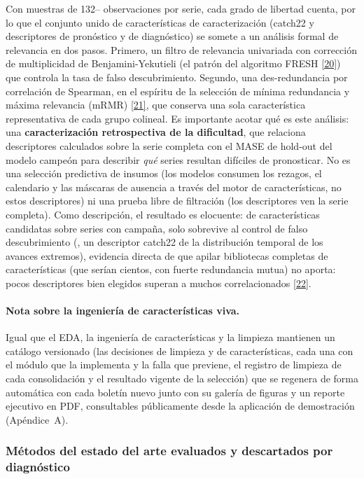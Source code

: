 \documentclass[12pt,letterpaper]{report}
\newcommand{\cita}[1]{\hyperref[bib:#1]{[#1]}}
\begin{document}
Con muestras de 132--\factNMonths{} observaciones por serie, cada grado de libertad cuenta, por
lo que el conjunto unido de características de caracterización (catch22 y descriptores
de pronóstico y de diagnóstico) se somete a un análisis formal de relevancia en dos pasos.
Primero, un filtro de relevancia univariada con corrección de multiplicidad de Benjamini-Yekutieli
(el patrón del algoritmo FRESH \cita{20}) que controla la tasa de falso descubrimiento.
Segundo, una des-redundancia por correlación de Spearman, en el espíritu de la selección
de mínima redundancia y máxima relevancia (mRMR) \cita{21}, que conserva una sola
característica representativa de cada grupo colineal. Es importante acotar qué es este
análisis: una \textbf{caracterización retrospectiva de la dificultad}, que relaciona
descriptores calculados sobre la serie completa con el MASE de hold-out del modelo
campeón para describir \textit{qué} series resultan difíciles de pronosticar. No es una
selección predictiva de insumos (los modelos consumen los rezagos, el calendario y las
máscaras de ausencia a través del motor de características, no estos descriptores) ni
una prueba libre de filtración (los descriptores ven la serie completa). Como
descripción, el resultado es elocuente: de \feFactSelIn{} características candidatas
sobre \feFactSelSeries{} series con campaña, solo \feFactSelRelevant{} sobrevive al
control de falso descubrimiento (\texttt{\feFactSelName}, un descriptor catch22 de la
distribución temporal de los avances extremos), evidencia directa de que apilar
bibliotecas completas de características (que serían cientos, con fuerte redundancia
mutua) no aporta: pocos descriptores bien elegidos superan a muchos correlacionados
\cita{22}.

\paragraph{Nota sobre la ingeniería de características viva.} Igual que el EDA, la
ingeniería de características y la limpieza mantienen un catálogo versionado
(las \feFactNCleanDecisions{} decisiones de limpieza y \feFactNFeDecisions{} de
características, cada una con el módulo que la implementa y la falla que previene, el
registro de limpieza de cada consolidación y el resultado vigente de la selección) que
se regenera de forma automática con cada boletín nuevo junto con su galería de figuras
y un reporte ejecutivo en PDF, consultables públicamente desde la aplicación de
demostración (Apéndice~A).

\subsubsection{Métodos del estado del arte evaluados y descartados por diagnóstico}
\end{document}
